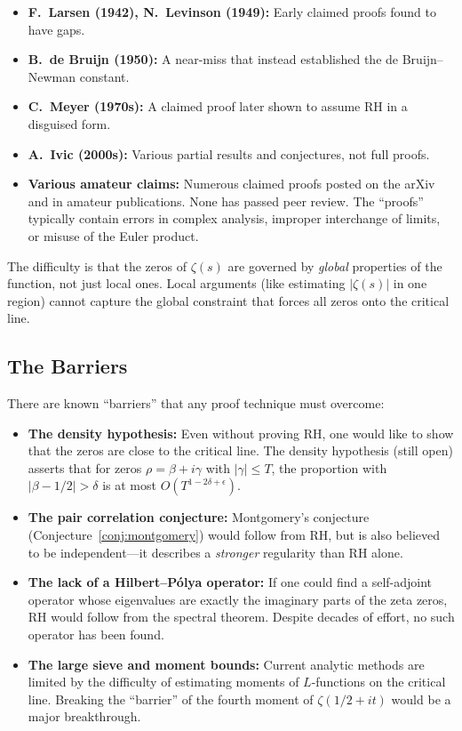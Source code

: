 \begin{itemize}
  \item \textbf{F.\ Larsen (1942), N.\ Levinson (1949):} Early claimed proofs found to have gaps.
  \item \textbf{B.\ de Bruijn (1950):} A near-miss that instead established the de Bruijn--Newman constant.
  \item \textbf{C.\ Meyer (1970s):} A claimed proof later shown to assume RH in a disguised form.
  \item \textbf{A.\ Ivic (2000s):} Various partial results and conjectures, not full proofs.
  \item \textbf{Various amateur claims:} Numerous claimed proofs posted on the arXiv and in amateur publications. None has passed peer review. The ``proofs'' typically contain errors in complex analysis, improper interchange of limits, or misuse of the Euler product.
\end{itemize}

The difficulty is that the zeros of $\zeta(s)$ are governed by \emph{global} properties of the function, not just local ones. Local arguments (like estimating $|\zeta(s)|$ in one region) cannot capture the global constraint that forces all zeros onto the critical line.

\subsection{The Barriers}

There are known ``barriers'' that any proof technique must overcome:

\begin{itemize}
  \item \textbf{The density hypothesis:} Even without proving RH, one would like to show that the zeros are close to the critical line. The density hypothesis (still open) asserts that for zeros $\rho = \beta + i\gamma$ with $|\gamma| \le T$, the proportion with $|\beta - 1/2| > \delta$ is at most $O(T^{1-2\delta+\epsilon})$.
  \item \textbf{The pair correlation conjecture:} Montgomery's conjecture (Conjecture~\ref{conj:montgomery}) would follow from RH, but is also believed to be independent---it describes a \emph{stronger} regularity than RH alone.
  \item \textbf{The lack of a Hilbert--P\'{o}lya operator:} If one could find a self-adjoint operator whose eigenvalues are exactly the imaginary parts of the zeta zeros, RH would follow from the spectral theorem. Despite decades of effort, no such operator has been found.
  \item \textbf{The large sieve and moment bounds:} Current analytic methods are limited by the difficulty of estimating moments of $L$-functions on the critical line. Breaking the ``barrier'' of the fourth moment of $\zeta(1/2+it)$ would be a major breakthrough.
\end{itemize}


